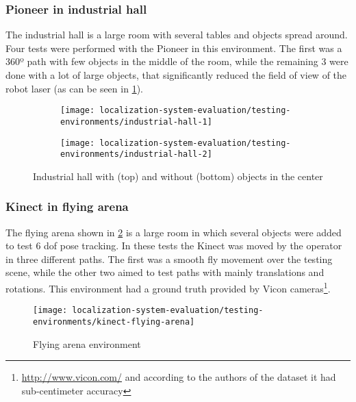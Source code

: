 \subsubsection{Pioneer in industrial hall}

The industrial hall is a large room with several tables and objects spread around. Four tests were performed with the Pioneer in this environment. The first was a 360º path with few objects in the middle of the room, while the remaining 3 were done with a lot of large objects, that significantly reduced the field of view of the robot laser (as can be seen in \cref{fig:localization-system-evaluation_industrial-hall}).

\begin{figure}[ht]
	\centering
	\begin{subfigure}[ht]{0.31\textwidth}
		\centering
		\texttt{[image: localization-system-evaluation/testing-environments/industrial-hall-1]}
	\end{subfigure}
	\begin{subfigure}[ht]{0.37\textwidth}
		\centering
		\texttt{[image: localization-system-evaluation/testing-environments/industrial-hall-2]}
	\end{subfigure}
	\caption{Industrial hall with (top) and without (bottom) objects in the center \cite{Sturm2012}}
	\label{fig:localization-system-evaluation_industrial-hall}
\end{figure}



\subsubsection{Kinect in flying arena}

The flying arena shown in \cref{fig:localization-system-evaluation_flying-arena} is a large room in which several objects were added to test 6 \gls{dof} pose tracking. In these tests the Kinect was moved by the operator in three different paths. The first was a smooth fly movement over the testing scene, while the other two aimed to test paths with mainly translations and rotations. This environment had a ground truth provided by Vicon cameras\footnote{\url{http://www.vicon.com/} and according to the authors of the dataset \cite{Pomerleau2011} it had sub-centimeter accuracy}.

\begin{figure}[ht]
	\centering
	\texttt{[image: localization-system-evaluation/testing-environments/kinect-flying-arena]}
	\caption{Flying arena environment \cite{Pomerleau2011}}
	\label{fig:localization-system-evaluation_flying-arena}
\end{figure}
